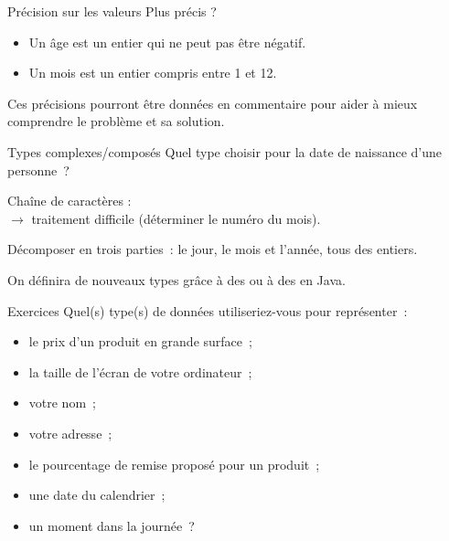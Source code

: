 \begin{hideedit}
\begin{frame}{Précision sur les valeurs}
  \pause
  Plus précis ?
  \begin{itemize}
    \item Un âge est un entier qui ne peut pas être négatif.
    \item Un mois est un entier compris entre 1 et 12.
  \end{itemize}

  Ces précisions pourront être données en commentaire
  pour aider à mieux comprendre le problème et sa solution.
\end{frame}

\begin{frame}{Types complexes/composés}
    Quel type choisir
    pour la date de naissance d’une personne~?

    \pause
    Chaîne de caractères :  \\
    \pause \(\longrightarrow\) traitement difficile
    (déterminer le numéro du mois).

    \pause
    Décomposer en trois parties~:
    le jour, le mois et l’année, tous des entiers.

    On définira de nouveaux types grâce à des  ou à des
     en Java.
\end{frame}

\begin{frame}{Exercices}
  Quel(s) type(s) de données utiliseriez-vous pour représenter~:
  \begin{itemize}
    \item le prix d’un produit en grande surface~;
    \item la taille de l’écran de votre ordinateur~;
    \item votre nom~;
    \item votre adresse~;
    \item le pourcentage de remise proposé pour un produit~;
    \item une date du calendrier~;
    \item un moment dans la journée~?
  \end{itemize}
\end{frame}


\end{hideedit}
